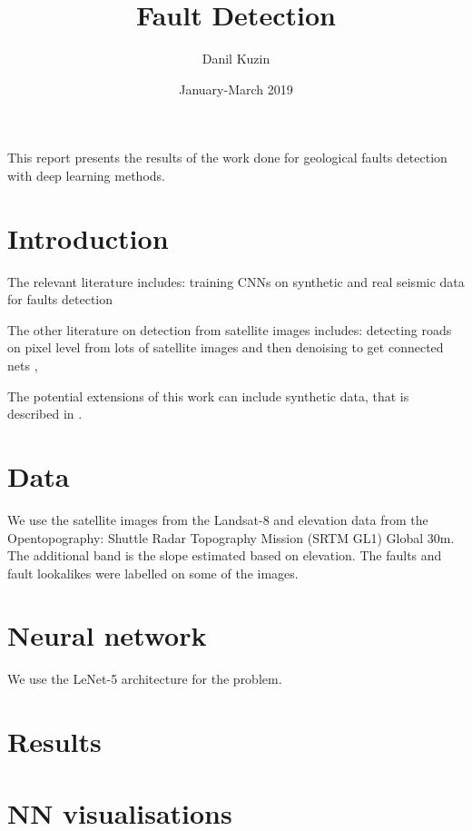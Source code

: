 \documentclass[11pt,a4paper]{article}
\begin{document}
\title{Fault Detection}
\author{Danil Kuzin}
\date{January-March 2019}
\maketitle

\abstract
This report presents the results of the work done for geological faults detection with deep learning methods.



\section{Introduction}

The relevant literature includes: training CNNs on synthetic and real seismic data for faults detection \cite{pochet2018seismic, araya2017automated, xiong2018seismic, chehrazi2013seismic, lu2018using}

The other literature on detection from satellite images includes: detecting roads on pixel level from lots of satellite images and then denoising to get connected nets \cite{mnih2010learning},

The potential extensions of this work can include synthetic data, that is described in \cite{hale2014}.

\section{Data}

We use the satellite images from the Landsat-8 and elevation data from the Opentopography:  Shuttle Radar Topography Mission (SRTM GL1) Global 30m. The additional band is the slope estimated based on elevation.
The faults and fault lookalikes were labelled on some of the images.

\section{Neural network}
We use the LeNet-5 architecture for the problem.

\section{Results}

\section{NN visualisations}

\printbibliography
\end{document}
